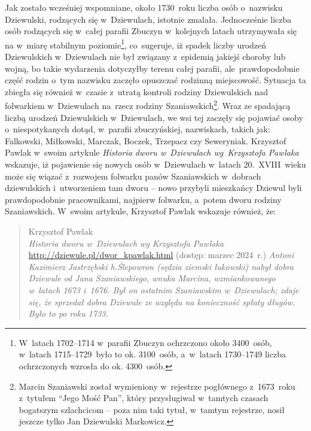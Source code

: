 Jak zostało wcześniej wspomniane, około 1730~roku liczba osób o~nazwisku 
Dziewulski, rodzących się w~Dziewulach, istotnie zmalała. Jednocześnie liczba 
osób rodzących się w~całej parafii Zbuczyn w~kolejnych latach utrzymywała się 
na w~miarę stabilnym poziomie\footnote{W~latach 1702--1714 w~parafii Zbuczyn 
ochrzczono około 3400~osób, w~latach 1715--1729~było to ok. 3100~osób, 
a~w~latach 1730--1749 liczba ochrzczonych wzrosła do ok. 4300~osób.},
co~sugeruje, iż spadek liczby urodzeń Dziewulskich w~Dziewulach nie był
związany z~epidemią jakiejś choroby lub wojną, bo takie wydarzenia dotyczyłby
terenu  całej parafii, ale~prawdopodobnie część rodzin o~tym nazwisku zaczęło 
opuszczać rodzinną miejscowość. Sytuacja ta zbiegła się również w~czasie 
z~utratą kontroli rodziny Dziewulskich nad folwarkiem w~Dziewulach na~rzecz 
rodziny Szaniawskich\footnote{Marcin Szaniawski został wymieniony w~rejestrze 
pogłównego z~1673~roku z~tytułem \enquote{Jego Mość Pan}, który przysługiwał 
w~tamtych czasach bogatszym szlachcicom -- poza nim taki tytuł, w~tamtym 
rejestrze, nosił jeszcze tylko Jan Dziewulski Markowicz.}. Wraz ze spadającą 
liczbą urodzeń Dziewulskich w~Dziewulach, we wsi tej zaczęły się pojawiać 
osoby o~niespotykanych dotąd, w~parafii zbuczyńskiej, nazwiskach, takich jak: 
Falkowski, Miłkowski, Marczak, Boczek, Trzepacz czy Seweryniak. Krzysztof 
Pawlak w~swoim artykule \emph{Historia dworu w~Dziewulach wg~Krzysztofa 
Pawlaka} \cite{kpawlak} wskazuje, iż pojawienie się nowych osób w~Dziewulach 
w~latach 20.~XVIII~wieku może się wiązać z~rozwojem folwarku panów 
Szaniawskich w~dobrach dziewulskich i~utworzeniem tam dworu -- nowo przybyli 
mieszkańcy Dziewul byli prawdopodobnie pracownikami, najpierw folwarku, 
a~potem dworu rodziny Szaniawskich. W~swoim artykule, Krzysztof Pawlak 
wskazuje również, że:

\begin{quote}{Krzysztof Pawlak \\ \null\hfill \emph{Historia dworu 
    w~Dziewulach wg Krzysztofa Pawlaka} \\ \null\hfill 
    \url{http://dziewule.pl/dwor_kpawlak.html} (dostęp: marzec 2024~r.)}
\textit{Antoni Kazimierz Jastrzębski h.Ślepowron (sędzia ziemski łukowski) 
nabył dobra Dziewule od Jana Szaniawskiego, wnuka Marcina, wzmiankowanego 
w~latach 1673 i~1676. Był on ostatnim Szaniawskim w~Dziewulach; zdaje się, 
że sprzedał dobra Dziewule ze względu na konieczność spłaty długów. Było to 
po roku 1733.}
\end{quote}

